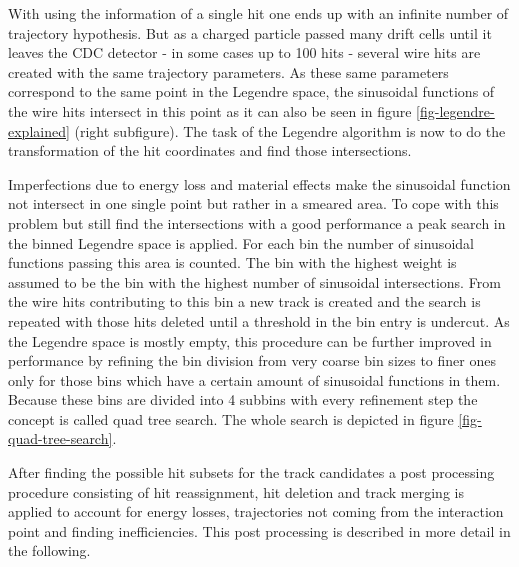 With using the information of a single hit one ends up with an infinite number of trajectory hypothesis. But as a charged particle passed many drift cells until it leaves the CDC detector - in some cases up to 100 hits - several wire hits are created with the same trajectory parameters. As these same parameters correspond to the same point in the Legendre space, the sinusoidal functions of the wire hits intersect in this point as it can also be seen in figure \ref{fig-legendre-explained} (right subfigure). The task of the Legendre algorithm is now to do the transformation of the hit coordinates and find those intersections.

Imperfections due to energy loss and material effects make the sinusoidal function not intersect in one single point but rather in a smeared area. To cope with this problem but still find the intersections with a good performance a peak search in the binned Legendre space is applied. For each bin the number of sinusoidal functions passing this area is counted. The bin with the highest weight is assumed to be the bin with the highest number of sinusoidal intersections. From the wire hits contributing to this bin a new track is created and the search is repeated with those hits deleted until a threshold in the bin entry is undercut. As the Legendre space is mostly empty, this procedure can be further improved in performance by refining the bin division from very coarse bin sizes to finer ones only for those bins which have a certain amount of sinusoidal functions in them. Because these bins are divided into 4 subbins with every refinement step the concept is called quad tree search. The whole search is depicted in figure \ref{fig-quad-tree-search}.

After finding the possible hit subsets for the track candidates a post processing procedure consisting of hit reassignment, hit deletion and track merging is applied to account for energy losses, trajectories not coming from the interaction point and finding inefficiencies. This post processing is described in more detail in the following.

